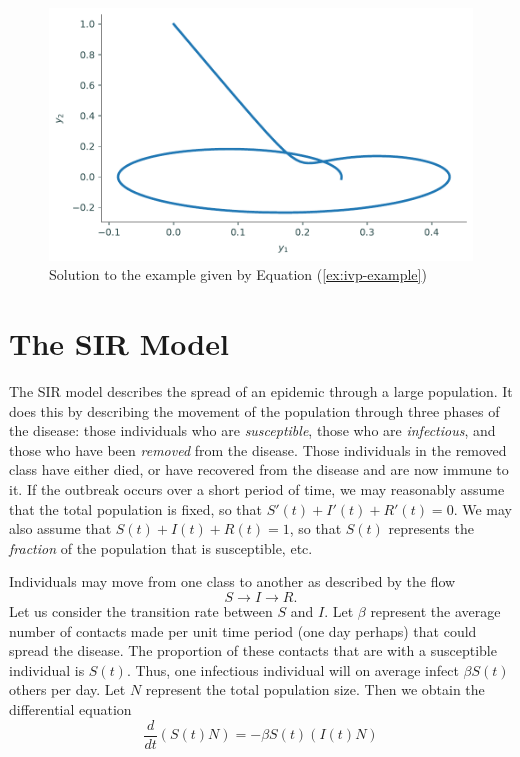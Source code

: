 \begin{figure}[ht]
    \centering
    \includegraphics[width=\textwidth]{figures/ivpexample1.pdf}
    \caption{Solution to the example given by Equation (\ref{ex:ivp-example})}
    \label{fig:ivp-example}
\end{figure}



\section*{The SIR Model}
The SIR model describes the spread of an epidemic through a large population.
It does this by describing the movement of the population through three phases of the disease: those individuals who are \emph{susceptible}, those who are \emph{infectious}, and those who have been \emph{removed} from the disease.
Those individuals in the removed class have either died, or have recovered from the disease and are now immune to it.
If the outbreak occurs over a short period of time, we may reasonably assume that the total population is fixed, so that $S'(t) + I'(t) + R'(t) = 0$.
We may also assume that $S(t) + I(t) + R(t) = 1$, so that $S(t)$ represents the \textit{fraction} of the population that is susceptible, etc.

Individuals may move from one class to another as described by the flow
\[S \to I \to R.\]
Let us consider the transition rate between $S$ and $I $.
Let $\beta$ represent the average number of contacts made per unit time period (one day perhaps) that could spread the disease.
The proportion of these contacts that are with a susceptible individual is $S(t)$.
Thus, one infectious individual will on average infect $\beta S(t)$ others per day.
Let $N$ represent the total population size.
Then we obtain the differential equation
\[\frac{d}{dt}(S(t) N) = -\beta S(t) (I(t) N)\]

